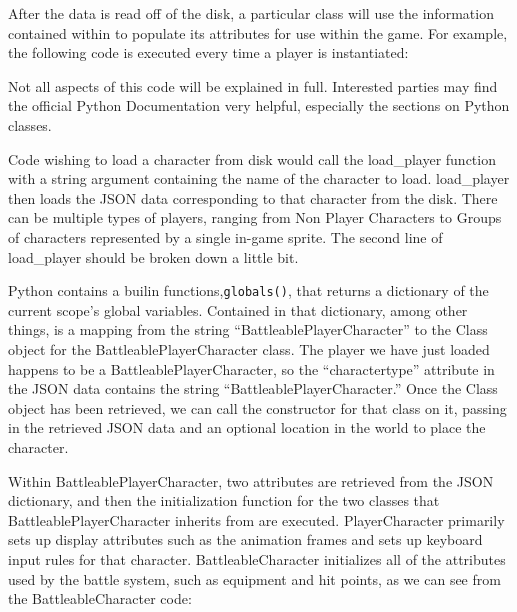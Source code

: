 \documentclass[11pt]{article}
\begin{document}
After the data is read off of the disk, a particular class will use the information contained within to populate its attributes for use within the game.  For example, the following code is executed every time a player is instantiated:

\singlespacing
{}
\doublespacing

Not all aspects of this code will be explained in full.  Interested parties may find the official Python Documentation \cite{PyDocs} very helpful, especially the sections on Python classes.

Code wishing to load a character from disk would call the load\_player function with a string argument containing the name of the character to load.  load\_player then loads the JSON data corresponding to that character from the disk.  There can be multiple types of players, ranging from Non Player Characters to Groups of characters represented by a single in-game sprite.  The second line of load\_player should be broken down a little bit.  

Python contains a builin functions,\texttt{globals()}, that returns a dictionary of the current scope's global variables. Contained in that dictionary, among other things, is a mapping from the string ``BattleablePlayerCharacter'' to the Class object for the BattleablePlayerCharacter class.  The player we have just loaded happens to be a BattleablePlayerCharacter, so the ``charactertype'' attribute in the JSON data contains the string ``BattleablePlayerCharacter.'' Once the Class object has been retrieved, we can call the constructor for that class on it, passing in the retrieved JSON data and an optional location in the world to place the character. 

Within BattleablePlayerCharacter, two attributes are retrieved from the JSON dictionary, and then the initialization function for the two classes that BattleablePlayerCharacter inherits from are executed.  PlayerCharacter primarily sets up display attributes such as the animation frames and sets up keyboard input rules for that character.  BattleableCharacter initializes all of the attributes used by the battle system, such as equipment and hit points, as we can see from the BattleableCharacter code:
\end{document}
